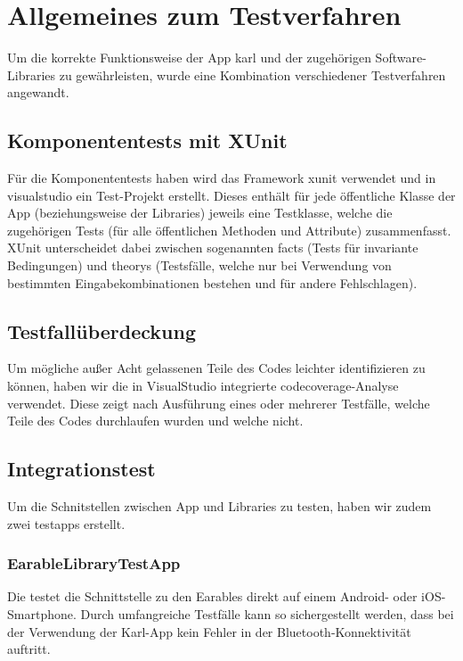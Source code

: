 \documentclass[../validierung.tex]{subfiles}
\begin{document}
\clearpage

\section{Allgemeines zum Testverfahren}
Um die korrekte Funktionsweise der App \Gls{karl} und der zugehörigen Software-Libraries zu gewährleisten,
wurde eine Kombination verschiedener Testverfahren angewandt.

\subsection{Komponententests mit XUnit}
Für die Komponententests haben wird das Framework \Gls{xunit} verwendet und in \gls{visualstudio} ein Test-Projekt erstellt.
Dieses enthält für jede öffentliche Klasse der App (beziehungsweise der Libraries) jeweils eine Testklasse, welche die zugehörigen Tests (für alle öffentlichen Methoden und Attribute) zusammenfasst.
XUnit unterscheidet dabei zwischen sogenannten \Gls{fact}s (Tests für invariante Bedingungen) und \Glspl{theory} (Testsfälle, welche nur bei Verwendung von bestimmten Eingabekombinationen bestehen und für andere Fehlschlagen).

\subsection{Testfallüberdeckung}
Um mögliche außer Acht gelassenen Teile des Codes leichter identifizieren zu können, haben wir die in VisualStudio integrierte \Gls{codecoverage}-Analyse verwendet.
Diese zeigt nach Ausführung eines oder mehrerer Testfälle, welche Teile des Codes durchlaufen wurden und welche nicht.

\subsection{Integrationstest}
Um die Schnitstellen zwischen App und Libraries zu testen, haben wir zudem zwei \Gls{testapp}s erstellt.

\subsubsection{EarableLibraryTestApp}
Die  testet die Schnittstelle zu den Earables direkt auf einem Android- oder iOS-Smartphone.
Durch umfangreiche Testfälle kann so sichergestellt werden, dass bei der Verwendung der Karl-App kein Fehler in der Bluetooth-Konnektivität auftritt.
\end{document}
